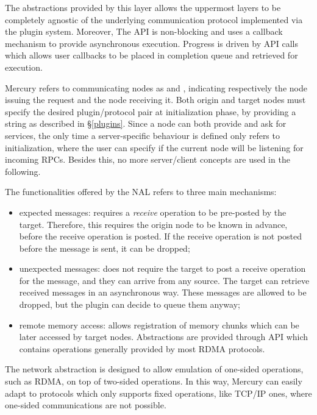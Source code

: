 The abstractions provided by this layer allows the uppermost layers to be completely agnostic of the underlying communication protocol implemented via the plugin system. Moreover, The API is non-blocking and uses a callback mechanism to provide asynchronous execution. Progress is driven by API calls which allows user callbacks to be placed in completion queue and retrieved for execution.\newline

Mercury refers to communicating nodes as  and , indicating respectively the node issuing the request and the node receiving it. Both origin and target nodes must specify the desired plugin/protocol pair at initialization phase, by providing a string as described in \S\ref{plugins}. Since a node can both provide and ask for services, the only time a server-specific behaviour is defined only refers to initialization, where the user can specify if the current node will be listening for incoming RPCs. Besides this, no more server/client concepts are used in the following.\newline

The functionalities offered by the NAL refers to three main mechanisms:
\begin{itemize}
    \item expected messages: requires a \textit{receive} operation to be pre-posted by the target. Therefore, this requires the origin node to be known in advance, before the receive operation is posted. If the receive operation is not posted before the message is sent, it can be dropped;
    \item unexpected messages: does not require the target to post a receive operation for the message, and they can arrive from any source. The target can retrieve received messages in an asynchronous way. These messages are allowed to be dropped, but the plugin can decide to queue them anyway;
    \item remote memory access: allows registration of memory chunks which can be later accessed by target nodes. Abstractions are provided through API which contains operations generally provided by most RDMA protocols.
\end{itemize}

The network abstraction is designed to allow emulation of one-sided operations, such as RDMA, on top of two-sided operations. In this way, Mercury can easily adapt to protocols which only supports fixed operations, like TCP/IP ones, where one-sided communications are not possible.


